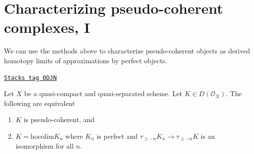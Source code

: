 \section{Characterizing pseudo-coherent complexes, I}
\label{perfect-section-pseudo-coherent-hocolim}
We can use the methods above to characterize pseudo-coherent
objects as derived homotopy limits of approximations by perfect objects.

\begin{lemma}
\label{perfect-lemma-pseudo-coherent-hocolim}
\href{https://stacks.math.columbia.edu/tag/0DJN}{\texttt{Stacks tag 0DJN}}

Let $X$ be a quasi-compact and quasi-separated scheme.
Let $K \in D(\mathcal{O}_X)$. The following are equivalent
\begin{enumerate}
\item $K$ is pseudo-coherent, and
\item $K = \text{hocolim} K_n$ where
$K_n$ is perfect and $\tau_{\geq -n}K_n \to \tau_{\geq -n}K$
is an isomorphism for all $n$.
\end{enumerate}
\end{lemma}


